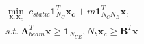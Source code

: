 \begin{align}\label{eq:main_problem}   
    &\min_{\bm{x},\bm{x}_c}~ c_{static}\bm{1}_{N_C}^T\bm{x_c} + m\bm{1}_{N_CN_B}^T\bm{x}, \\
    &s.t. ~ {\bm{A}_{beam}^T}\bm{x} \ge \bm{1}_{N_{UE}}, N_b\bm{x}_c \ge \bm{B}^T\bm{x} \nonumber
\end{align}
